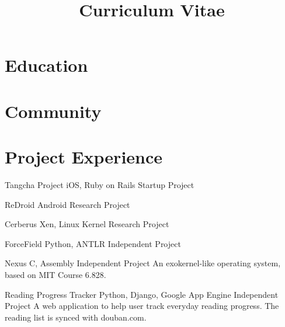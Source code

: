 \documentclass[11pt,a4paper]{moderncv}
\title{Curriculum Vitae}
\begin{document}
\maketitle

\section{Education}

\section{Community}

\section{Project Experience}

{Tangcha Project}
{iOS, Ruby on Rails}
{Startup Project}{}
{}

\vspace*{0.2\baselineskip}
{ReDroid}
{Android}
{Research Project}{}
{}

\vspace*{0.2\baselineskip}
{Cerberus}
{Xen, Linux Kernel}
{Research Project}{}
{}

{ForceField}
{Python, ANTLR}
{Independent Project}{}
{}

\vspace*{0.2\baselineskip}

{Nexus}
{C, Assembly}
{Independent Project}{}
{
An exokernel-like operating system, based on MIT Course 6.828.
}

\vspace*{0.2\baselineskip}
{Reading Progress Tracker}
{Python, Django, Google App Engine}
{Independent Project}{}
{
A web application to help user track everyday reading progress. The reading list is synced with douban.com.
}
\end{document}
